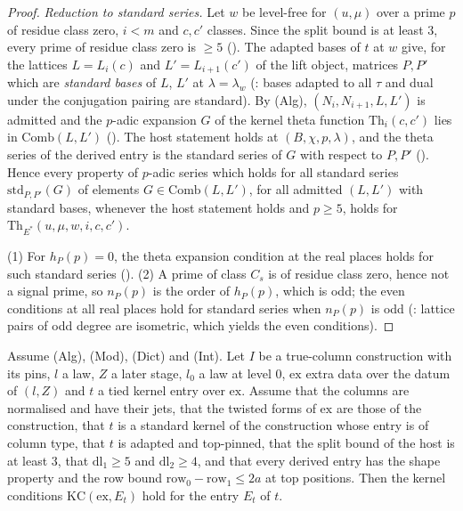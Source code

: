 \begin{proof}
\emph{Reduction to standard series.} Let $w$ be level-free for $(u,\mu)$ over a prime $p$ of residue class zero, $i<m$ and
$c,c'$ classes. Since the split bound is at least $3$, every prime of residue class zero is $\ge5$
(). The adapted bases of $t$ at $w$ give, for the
lattices $L=L_i(c)$ and $L'=L_{i+1}(c')$ of the lift object, matrices $P,P'$ which are \emph{standard bases} of $L$, $L'$ at
$\lambda=\lambda_w$ (: bases adapted to all
$\tau$ and dual under the conjugation pairing are standard). By \textup{(Alg)}, $(N_i,N_{i+1},L,L')$ is admitted and the
$p$-adic expansion $G$ of the kernel theta function $\mathrm{Th}_i(c,c')$ lies in $\mathrm{Comb}(L,L')$
(). The host statement holds at $(B,\chi,p,\lambda)$, and the theta series
of the derived entry is the standard series of $G$ with respect to $P,P'$
(). Hence every property of $p$-adic series which holds
for all standard series $\mathrm{std}_{P,P'}(G)$ of elements $G\in\mathrm{Comb}(L,L')$, for all admitted $(L,L')$ with standard
bases, whenever the host statement holds and $p\ge5$, holds for $\mathrm{Th}_{E^\ast}(u,\mu,w,i,c,c')$.

(1) For $h_P(p)=0$, the theta expansion condition at the real places holds for such standard series
().
(2) A prime of class $C_s$ is of residue class zero, hence not a signal prime, so $n_P(p)$ is the order of $h_P(p)$, which is
odd; the even conditions at all real places hold for standard series when $n_P(p)$ is odd
(: lattice pairs of odd degree are isometric, which yields the
even conditions).
\end{proof}

\begin{theorem}\label{pf:reckernel:atTrue}
Assume \textup{(Alg)}, \textup{(Mod)}, \textup{(Dict)} and \textup{(Int)}. Let $I$ be a true-column construction with its
pins, $l$ a law, $Z$ a later stage, $l_0$ a law at level $0$, $\mathrm{ex}$ extra data over the datum of $(l,Z)$ and $t$ a tied
kernel entry over $\mathrm{ex}$. Assume that the columns are normalised and have their jets, that the twisted forms of
$\mathrm{ex}$ are those of the construction, that $t$ is a standard kernel of the construction whose entry is of column type,
that $t$ is adapted and top-pinned, that the split bound of the host is at least $3$, that $\mathrm{dl}_1\ge5$ and
$\mathrm{dl}_2\ge4$, and that every derived entry has the shape property and the row bound
$\mathrm{row}_0-\mathrm{row}_1\le2a$ at top positions. Then the kernel conditions $\mathrm{KC}(\mathrm{ex},E_t)$ hold for the entry $E_t$ of
$t$.
\end{theorem}

